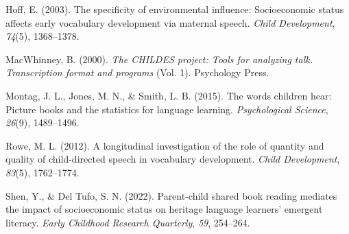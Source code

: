 \documentclass[10pt, letterpaper]{article}
\newenvironment{CSLReferences}%
  {}%
  {\par}
\begin{document}
\begin{CSLReferences}{1}{0}
\leavevmode\hypertarget{ref-hoff2003specificity}{}%
Hoff, E. (2003). The specificity of environmental influence:
Socioeconomic status affects early vocabulary development via maternal
speech. \emph{Child Development}, \emph{74}(5), 1368--1378.

\leavevmode\hypertarget{ref-macwhinney2000childes}{}%
MacWhinney, B. (2000). \emph{The CHILDES project: Tools for analyzing
talk. Transcription format and programs} (Vol. 1). Psychology Press.

\leavevmode\hypertarget{ref-montag2015words}{}%
Montag, J. L., Jones, M. N., \& Smith, L. B. (2015). The words children
hear: Picture books and the statistics for language learning.
\emph{Psychological Science}, \emph{26}(9), 1489--1496.

\leavevmode\hypertarget{ref-rowe2012longitudinal}{}%
Rowe, M. L. (2012). A longitudinal investigation of the role of quantity
and quality of child-directed speech in vocabulary development.
\emph{Child Development}, \emph{83}(5), 1762--1774.

\leavevmode\hypertarget{ref-shen2022parent}{}%
Shen, Y., \& Del Tufo, S. N. (2022). Parent-child shared book reading
mediates the impact of socioeconomic status on heritage language
learners' emergent literacy. \emph{Early Childhood Research Quarterly},
\emph{59}, 254--264.

\end{CSLReferences}


\end{document}
